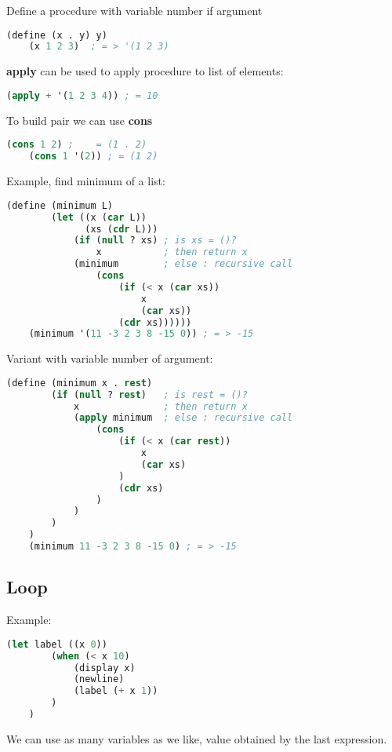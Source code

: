 Define a procedure with variable number if argument
\begin{lstlisting}[language=Lisp]
    (define (x . y) y)
    (x 1 2 3)  ; = > '(1 2 3)
\end{lstlisting}
\textbf{apply} can be used to apply procedure to list of elements:
\begin{lstlisting}[language=Lisp]
    (apply + '(1 2 3 4)) ; = 10
\end{lstlisting}
To build pair we can use \textbf{cons}
\begin{lstlisting}[language=Lisp]
    (cons 1 2) ;    = (1 . 2)
    (cons 1 '(2)) ; = (1 2)
\end{lstlisting}
Example, find minimum of a list:
\begin{lstlisting}[language=Lisp]
    (define (minimum L)
        (let ((x (car L))
              (xs (cdr L)))
            (if (null ? xs) ; is xs = ()?
                x           ; then return x
            (minimum        ; else : recursive call
                (cons
                    (if (< x (car xs))
                        x
                        (car xs))
                    (cdr xs))))))
    (minimum '(11 -3 2 3 8 -15 0)) ; = > -15
\end{lstlisting}
Variant with variable number of argument:
\begin{lstlisting}[language=Lisp]
    (define (minimum x . rest)
        (if (null ? rest)   ; is rest = ()?
            x               ; then return x
            (apply minimum  ; else : recursive call
                (cons
                    (if (< x (car rest))
                        x
                        (car xs)
                    )
                    (cdr xs)
                )
            )
        )
    )
    (minimum 11 -3 2 3 8 -15 0) ; = > -15
\end{lstlisting}

\subsection{Loop}
Example:
\begin{lstlisting}[language=Lisp]
    (let label ((x 0))
        (when (< x 10)
            (display x)
            (newline)
            (label (+ x 1))
        )
    )
\end{lstlisting}
We can use as many variables as we like, value obtained by the last expression.

